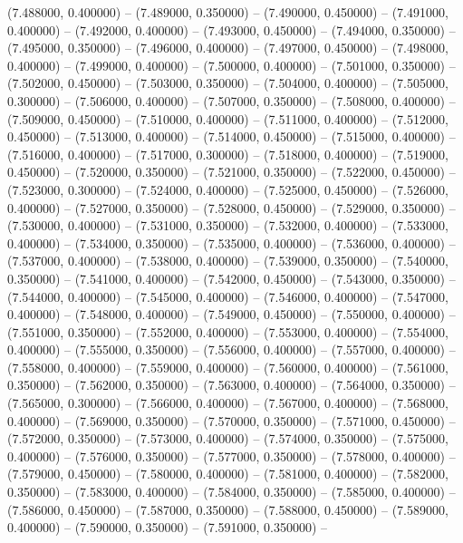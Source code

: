 (7.488000, 0.400000) -- 
(7.489000, 0.350000) -- 
(7.490000, 0.450000) -- 
(7.491000, 0.400000) -- 
(7.492000, 0.400000) -- 
(7.493000, 0.450000) -- 
(7.494000, 0.350000) -- 
(7.495000, 0.350000) -- 
(7.496000, 0.400000) -- 
(7.497000, 0.450000) -- 
(7.498000, 0.400000) -- 
(7.499000, 0.400000) -- 
(7.500000, 0.400000) -- 
(7.501000, 0.350000) -- 
(7.502000, 0.450000) -- 
(7.503000, 0.350000) -- 
(7.504000, 0.400000) -- 
(7.505000, 0.300000) -- 
(7.506000, 0.400000) -- 
(7.507000, 0.350000) -- 
(7.508000, 0.400000) -- 
(7.509000, 0.450000) -- 
(7.510000, 0.400000) -- 
(7.511000, 0.400000) -- 
(7.512000, 0.450000) -- 
(7.513000, 0.400000) -- 
(7.514000, 0.450000) -- 
(7.515000, 0.400000) -- 
(7.516000, 0.400000) -- 
(7.517000, 0.300000) -- 
(7.518000, 0.400000) -- 
(7.519000, 0.450000) -- 
(7.520000, 0.350000) -- 
(7.521000, 0.350000) -- 
(7.522000, 0.450000) -- 
(7.523000, 0.300000) -- 
(7.524000, 0.400000) -- 
(7.525000, 0.450000) -- 
(7.526000, 0.400000) -- 
(7.527000, 0.350000) -- 
(7.528000, 0.450000) -- 
(7.529000, 0.350000) -- 
(7.530000, 0.400000) -- 
(7.531000, 0.350000) -- 
(7.532000, 0.400000) -- 
(7.533000, 0.400000) -- 
(7.534000, 0.350000) -- 
(7.535000, 0.400000) -- 
(7.536000, 0.400000) -- 
(7.537000, 0.400000) -- 
(7.538000, 0.400000) -- 
(7.539000, 0.350000) -- 
(7.540000, 0.350000) -- 
(7.541000, 0.400000) -- 
(7.542000, 0.450000) -- 
(7.543000, 0.350000) -- 
(7.544000, 0.400000) -- 
(7.545000, 0.400000) -- 
(7.546000, 0.400000) -- 
(7.547000, 0.400000) -- 
(7.548000, 0.400000) -- 
(7.549000, 0.450000) -- 
(7.550000, 0.400000) -- 
(7.551000, 0.350000) -- 
(7.552000, 0.400000) -- 
(7.553000, 0.400000) -- 
(7.554000, 0.400000) -- 
(7.555000, 0.350000) -- 
(7.556000, 0.400000) -- 
(7.557000, 0.400000) -- 
(7.558000, 0.400000) -- 
(7.559000, 0.400000) -- 
(7.560000, 0.400000) -- 
(7.561000, 0.350000) -- 
(7.562000, 0.350000) -- 
(7.563000, 0.400000) -- 
(7.564000, 0.350000) -- 
(7.565000, 0.300000) -- 
(7.566000, 0.400000) -- 
(7.567000, 0.400000) -- 
(7.568000, 0.400000) -- 
(7.569000, 0.350000) -- 
(7.570000, 0.350000) -- 
(7.571000, 0.450000) -- 
(7.572000, 0.350000) -- 
(7.573000, 0.400000) -- 
(7.574000, 0.350000) -- 
(7.575000, 0.400000) -- 
(7.576000, 0.350000) -- 
(7.577000, 0.350000) -- 
(7.578000, 0.400000) -- 
(7.579000, 0.450000) -- 
(7.580000, 0.400000) -- 
(7.581000, 0.400000) -- 
(7.582000, 0.350000) -- 
(7.583000, 0.400000) -- 
(7.584000, 0.350000) -- 
(7.585000, 0.400000) -- 
(7.586000, 0.450000) -- 
(7.587000, 0.350000) -- 
(7.588000, 0.450000) -- 
(7.589000, 0.400000) -- 
(7.590000, 0.350000) -- 
(7.591000, 0.350000) -- 
